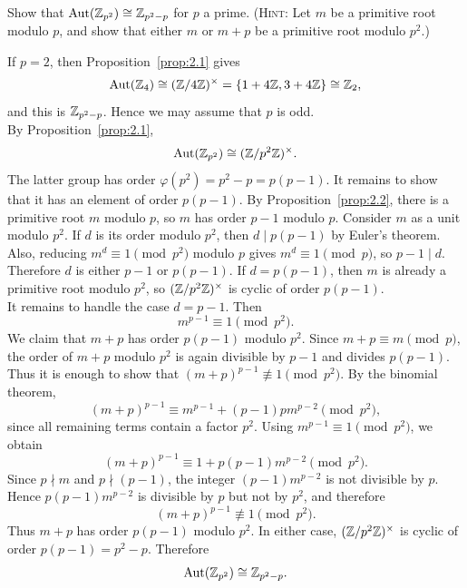 \documentclass[../Odyssey_Project.tex]{subfiles}
\begin{document}
\begin{exercise}
\label{ex:2.3}
Show that $\operatorname{Aut}(\mathbb{Z}_{p^2}) \cong \mathbb{Z}_{p^2-p}$ for $p$ a prime. (\textsc{Hint:} Let $m$ be a primitive root modulo $p$, and show that either $m$ or $m+p$ be a primitive root modulo $p^2$.)
\end{exercise}
\begin{solution}
    If $p = 2$, then Proposition~\ref{prop:2.1} gives
    \[
        \operatorname{Aut}(\mathbb{Z}_4) \cong (\mathbb{Z}/4\mathbb{Z})^{\times} = \{1 + 4\mathbb{Z}, 3 + 4\mathbb{Z}\} \cong \mathbb{Z}_2,
    \]
    and this is $\mathbb{Z}_{p^2 - p}$. Hence we may assume that $p$ is odd. \\
    By Proposition~\ref{prop:2.1},
    \[
        \operatorname{Aut}(\mathbb{Z}_{p^2}) \cong (\mathbb{Z}/p^2\mathbb{Z})^{\times}.
    \]
    The latter group has order $\varphi(p^2) = p^2 - p = p(p - 1)$. It remains to show that it has an element of order $p(p - 1)$. By Proposition~\ref{prop:2.2}, there is a primitive root $m$ modulo $p$, so $m$ has order $p - 1$ modulo $p$. Consider $m$ as a unit modulo $p^2$. If $d$ is its order modulo $p^2$, then $d \mid p(p - 1)$ by Euler's theorem. Also, reducing $m^d \equiv 1 \pmod{p^2}$ modulo $p$ gives $m^d \equiv 1 \pmod{p}$, so $p - 1 \mid d$. Therefore $d$ is either $p - 1$ or $p(p - 1)$. If $d = p(p - 1)$, then $m$ is already a primitive root modulo $p^2$, so $(\mathbb{Z}/p^2\mathbb{Z})^{\times}$ is cyclic of order $p(p - 1)$. \\
    It remains to handle the case $d = p - 1$. Then
    \[
        m^{p - 1} \equiv 1 \pmod{p^2}.
    \]
    We claim that $m + p$ has order $p(p - 1)$ modulo $p^2$. Since $m + p \equiv m \pmod{p}$, the order of $m + p$ modulo $p^2$ is again divisible by $p - 1$ and divides $p(p - 1)$. Thus it is enough to show that $(m + p)^{p - 1} \not\equiv 1 \pmod{p^2}$. By the binomial theorem,
    \[
        (m + p)^{p - 1}
        \equiv m^{p - 1} + (p - 1)pm^{p - 2}
        \pmod{p^2},
    \]
    since all remaining terms contain a factor $p^2$. Using $m^{p - 1} \equiv 1 \pmod{p^2}$, we obtain
    \[
        (m + p)^{p - 1}
        \equiv 1 + p(p - 1)m^{p - 2}
        \pmod{p^2}.
    \]
    Since $p \nmid m$ and $p \nmid (p - 1)$, the integer $(p - 1)m^{p - 2}$ is not divisible by $p$. Hence $p(p - 1)m^{p - 2}$ is divisible by $p$ but not by $p^2$, and therefore
    \[
        (m + p)^{p - 1} \not\equiv 1 \pmod{p^2}.
    \]
    Thus $m + p$ has order $p(p - 1)$ modulo $p^2$. In either case, $(\mathbb{Z}/p^2\mathbb{Z})^{\times}$ is cyclic of order $p(p - 1) = p^2 - p$. Therefore
    \[
        \operatorname{Aut}(\mathbb{Z}_{p^2}) \cong \mathbb{Z}_{p^2 - p}.
    \]
\end{solution}
\end{document}
